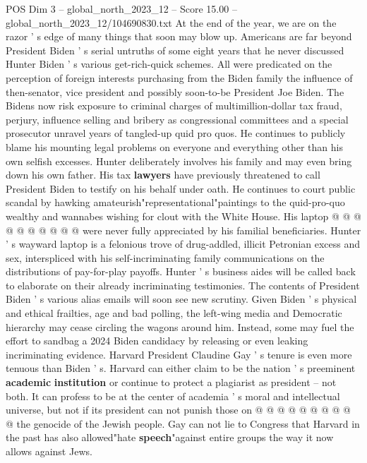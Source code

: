 \begin{textsample}{POS Dim 3 – global\_north\_2023\_12 – Score 15.00 – global\_north\_2023\_12/104690830.txt}  \label{ex:f3_pos_223}
At the end of the year, we are on the razor ' s edge of many things that soon may blow up.
Americans are far beyond President Biden ' s serial untruths of some eight years that he never discussed Hunter Biden ' s various get-rich-quick schemes.
All were predicated on the perception of foreign interests purchasing from the Biden family the influence of then-senator, vice president and possibly soon-to-be President Joe Biden.
The Bidens now risk exposure to criminal charges of multimillion-dollar tax fraud, perjury, influence selling and bribery as congressional committees and a special prosecutor unravel years of tangled-up quid pro quos.
He continues to publicly blame his mounting legal problems on everyone and everything other than his own selfish excesses.
Hunter deliberately involves his family and may even bring down his own father.
His tax \textbf{lawyers} have previously threatened to call President Biden to testify on his behalf under oath.
He continues to court public scandal by hawking amateurish"representational"paintings to the quid-pro-quo wealthy and wannabes wishing for clout with the White House.
His laptop @ @ @ @ @ @ @ @ @ @ were never fully appreciated by his familial beneficiaries.
Hunter ' s wayward laptop is a felonious trove of drug-addled, illicit Petronian excess and sex, interspliced with his self-incriminating family communications on the distributions of pay-for-play payoffs.
Hunter ' s business aides will be called back to elaborate on their already incriminating testimonies.
The contents of President Biden ' s various alias emails will soon see new scrutiny.
Given Biden ' s physical and ethical frailties, age and bad polling, the left-wing media and Democratic hierarchy may cease circling the wagons around him.
Instead, some may fuel the effort to sandbag a 2024 Biden candidacy by releasing or even leaking incriminating evidence.
Harvard President Claudine Gay ' s tenure is even more tenuous than Biden ' s.
Harvard can either claim to be the nation ' s preeminent \textbf{academic} \textbf{institution} or continue to protect a plagiarist as president -- not both.
It can profess to be at the center of academia ' s moral and intellectual universe, but not if its president can not punish those on @ @ @ @ @ @ @ @ @ @ the genocide of the Jewish people.
Gay can not lie to Congress that Harvard in the past has also allowed"hate \textbf{speech}"against entire groups the way it now allows against Jews.

\end{textsample}
